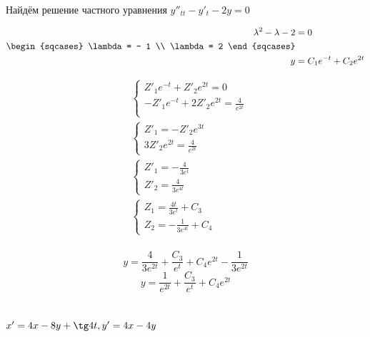 Найдём решение частного уравнения $y''_{tt} - y'_t - 2y = 0$

\begin{align*}
    \lambda^2 - \lambda - 2 & = 0                         \\
    \begin{sqcases}
        \lambda = - 1 \\
        \lambda = 2
    \end{sqcases}                            \\
    y                       & = C_1 e^{ - t} + C_2 e^{2t}
\end{align*}

\begin{align*}
     & \begin{cases}
        Z'_1 e^{ - t} + Z'_2 e^{2t}   = 0                \\
        -Z'_1 e^{ - t} + 2Z'_2 e^{2t} = \frac{4}{e^{2t}} \\
    \end{cases} \\
     & \begin{cases}
        Z'_1 = - Z'_2e^{3t} \\
        3Z'_2 e^{2t} = \frac{4}{e^{2t}}
    \end{cases} \\
     & \begin{cases}
        Z'_1 = - \frac{4}{3e^t} \\
        Z'_2 = \frac{4}{3e^{4t}}
    \end{cases} \\
     & \begin{cases}
        Z_1 = \frac{4t}{3e^t} + C_3 \\
        Z_2 = - \frac{1}{3e^{4 t}} + C_4
    \end{cases} \\
\end{align*}

\[y = \frac{4}{3e^{2t}} + \frac{C_3}{e^t} + C_4e^{2t} - \frac{1}{3e^{2t}}\]
\[y = \frac{1}{e^{2t}} + \frac{C_3}{e^t} + C_4e^{2t}\]

\section{$x'=4x-8y+\tg 4t, y'=4x-4y$}



